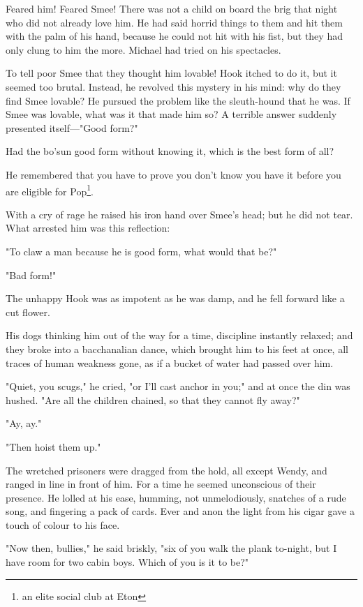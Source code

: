 Feared him! Feared Smee! There was not a child on board the brig that
night who did not already love him. He had said horrid things to them and
hit them with the palm of his hand, because he could not hit with his
fist, but they had only clung to him the more. Michael had tried on his
spectacles.


To tell poor Smee that they thought him lovable! Hook itched to do it, but
it seemed too brutal. Instead, he revolved this mystery in his mind: why
do they find Smee lovable? He pursued the problem like the sleuth-hound
that he was. If Smee was lovable, what was it that made him so? A terrible
answer suddenly presented itself—"Good form?"


Had the bo'sun good form without knowing it, which is the best form of
all?


He remembered that you have to prove you don't know you have it before you
are eligible for Pop\footnote{an elite social club at Eton}.


With a cry of rage he raised his iron hand over Smee's head; but he did
not tear. What arrested him was this reflection:


"To claw a man because he is good form, what would that be?"


"Bad form!"


The unhappy Hook was as impotent as he was damp, and he fell
forward like a cut flower.


His dogs thinking him out of the way for a time, discipline instantly
relaxed; and they broke into a bacchanalian dance, which brought
him to his feet at once, all traces of human weakness gone, as if a bucket
of water had passed over him.


"Quiet, you scugs," he cried, "or I'll cast anchor in you;" and at once
the din was hushed. "Are all the children chained, so that they cannot fly
away?"


"Ay, ay."


"Then hoist them up."


The wretched prisoners were dragged from the hold, all except Wendy, and
ranged in line in front of him. For a time he seemed unconscious of their
presence. He lolled at his ease, humming, not unmelodiously, snatches of a
rude song, and fingering a pack of cards. Ever and anon the light from his
cigar gave a touch of colour to his face.


"Now then, bullies," he said briskly, "six of you walk the plank to-night,
but I have room for two cabin boys. Which of you is it to be?"


